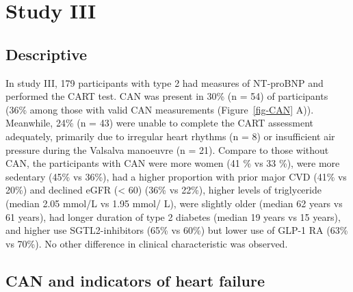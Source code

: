 \documentclass[
  a4paper,
  headsepline=true,
  open=any]{scrbook}
\begin{document}
\hypertarget{study-iii}{%
\section{Study III}\label{study-iii}}

\hypertarget{descriptive-2}{%
\subsection{Descriptive}\label{descriptive-2}}

In study III, 179 participants with type 2 had measures of NT-proBNP and
performed the CART test. CAN was present in 30\% (n = 54) of
participants (36\% among those with valid CAN measurements
(Figure~\ref{fig-CAN} A)). Meanwhile, 24\% (n = 43) were unable to
complete the CART assessment adequately, primarily due to irregular
heart rhythms (n = 8) or insufficient air pressure during the Valsalva
manoeuvre (n = 21). Compare to those without CAN, the participants with
CAN were more women (41 \% vs 33 \%), were more sedentary (45\% vs
36\%), had a higher proportion with prior major CVD (41\% vs 20\%) and
declined eGFR (\textless{} 60) (36\% vs 22\%), higher levels of
triglyceride (median 2.05 mmol/L vs 1.95 mmol/ L), were slightly older
(median 62 years vs 61 years), had longer duration of type 2 diabetes
(median 19 years vs 15 years), and higher use SGTL2-inhibitors (65\% vs
60\%) but lower use of GLP-1 RA (63\% vs 70\%). No other difference in
clinical characteristic was observed.

\hypertarget{can-and-indicators-of-heart-failure}{%
\subsection{CAN and indicators of heart
failure}\label{can-and-indicators-of-heart-failure}}
\end{document}
